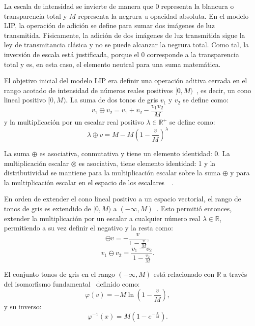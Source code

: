La escala de intensidad se invierte de manera que 0 representa la blancura o transparencia total y $M$ representa la negrura u opacidad absoluta. En el modelo LIP, la operación de adición se define para sumar dos imágenes de luz transmitida. Físicamente, la adición de dos imágenes de luz transmitida sigue la ley de transmitancia clásica y no se puede alcanzar la negrura total. Como tal, la inversión de escala está justificada, porque el 0 corresponde a la transparencia total y es, en esta caso, el elemento neutral para una suma matemática.

El objetivo inicial del modelo LIP era definir una operación aditiva cerrada en el rango acotado de intensidad de números reales positivos $[0, M)$~\cite{jourlin1988model}, es decir, un cono lineal positivo $[0, M )$. La suma de dos tonos de gris $v_1$ y $v_2$ se define como:
\begin{equation}
	v_1\oplus v_2=v_1+v_2-\frac{v_1v_2}{M}
\end{equation}
y la multiplicación por un escalar real positivo $\lambda \in \mathbb{R}^+$ se define como:
\begin{equation}
	\lambda \oplus v = M - M\left(1-\frac{v}{M}\right)^\lambda
\end{equation}

La suma $\oplus$ es asociativa, conmutativa y tiene un elemento identidad: 0. La multiplicaci\'on escalar $\otimes$ es asociativa, tiene elemento identidad: 1 y la distributividad se mantiene para la multiplicación escalar sobre la suma $\oplus$ y para la multiplicación escalar en el espacio de los escalares~\cite{jourlin1988model}~\cite{jourlin2016logarithmic}.

En orden de extender el cono lineal positivo a un espacio vectorial, el rango de tonos de gris es extendido de $[0,M)$ a $(-\infty,M)$~\cite{jourlin2016logarithmic}. Esto permiti\'o entonces, extender la multiplicaci\'on por un escalar a cualquier n\'umero real $\lambda \in \mathbb{R}$, permitiendo a su vez definir el negativo y la resta como:
\begin{equation}
	\ominus v=-\frac{v}{1-\frac{v}{M}},
\end{equation}
\begin{equation}
	v_1 \ominus v_2 = \frac{v_1-v_2}{1-\frac{v_2}{M}}.
\end{equation}

El conjunto tonos de gris en el rango $(-\infty, M)$ está relacionado con $\mathbb{R}$ a través del isomorfismo fundamental~\cite{jourlin2016logarithmic} definido como:
\begin{equation}
	\varphi(v) = -M\ln\left(1-\frac{v}{M}\right),
\end{equation}
y su inverso:
\begin{equation}
	\varphi^{-1} (x) = M\left(1-e^{-\frac{x}{M}}\right).
\end{equation}

